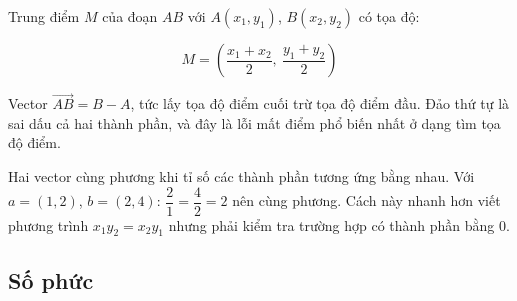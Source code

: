 \documentclass[11pt, a4paper]{article}
\begin{document}
\begin{dinhly}
Trung điểm $M$ của đoạn $AB$ với $A(x_1, y_1)$, $B(x_2, y_2)$ có tọa độ:

$$M = \left(\frac{x_1 + x_2}{2},\ \frac{y_1 + y_2}{2}\right)$$

 Vector $\overrightarrow{AB} = B - A$, tức lấy tọa độ điểm cuối trừ tọa độ điểm đầu. Đảo thứ tự là sai dấu cả hai thành phần, và đây là lỗi mất điểm phổ biến nhất ở dạng tìm tọa độ điểm.

 Hai vector cùng phương khi tỉ số các thành phần tương ứng bằng nhau. Với $a = (1,2)$, $b = (2,4)$: $\dfrac{2}{1} = \dfrac{4}{2} = 2$ nên cùng phương. Cách này nhanh hơn viết phương trình $x_1y_2 = x_2y_1$ nhưng phải kiểm tra trường hợp có thành phần bằng $0$.
\end{dinhly}
\subsection{Số phức}
\end{document}

